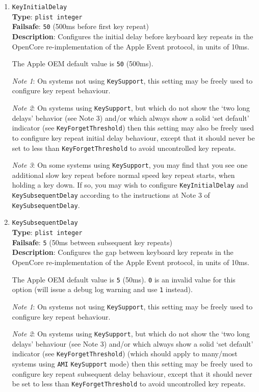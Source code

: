 \documentclass[]{article}
\begin{document}
\begin{enumerate}
\item
  \texttt{KeyInitialDelay}\\
  \textbf{Type}: \texttt{plist\ integer}\\
  \textbf{Failsafe}: \texttt{50} (500ms before first key repeat)\\
  \textbf{Description}: Configures the initial delay before keyboard key repeats in the
  OpenCore re-implementation of the Apple Event protocol, in units of 10ms.

  The Apple OEM default value is \texttt{50} (500ms).

  \emph{Note 1}: On systems not using \texttt{KeySupport}, this setting may be freely used
  to configure key repeat behaviour.

  \emph{Note 2}: On systems using \texttt{KeySupport}, but which do not show the `two long
  delays' behavior (see Note 3) and/or which always show a solid `set default' indicator (see \texttt{KeyForgetThreshold})
  then this setting may also be freely used to configure key repeat initial delay behaviour,
  except that it should never be set to less than \texttt{KeyForgetThreshold} to avoid
  uncontrolled key repeats.

  \emph{Note 3}: On some systems using \texttt{KeySupport}, you may find that you see
  one additional slow key repeat before normal speed key repeat starts, when holding a
  key down. If so, you may wish to configure \texttt{KeyInitialDelay} and \texttt{KeySubsequentDelay}
  according to the instructions at Note 3 of \texttt{KeySubsequentDelay}.


\item
  \texttt{KeySubsequentDelay}\\
  \textbf{Type}: \texttt{plist\ integer}\\
  \textbf{Failsafe}: \texttt{5} (50ms between subsequent key repeats)\\
  \textbf{Description}: Configures the gap between keyboard key repeats in the OpenCore re-implementation
  of the Apple Event protocol, in units of 10ms.

  The Apple OEM default value is \texttt{5} (50ms).
  \texttt{0} is an invalid value for this option (will issue a debug log warning and use \texttt{1} instead).

  \emph{Note 1}: On systems not using \texttt{KeySupport}, this setting may be freely used
  to configure key repeat behaviour.

  \emph{Note 2}: On systems using \texttt{KeySupport}, but which do not show the `two long
  delays' behaviour (see Note 3) and/or which always show a solid `set default' indicator
  (see \texttt{KeyForgetThreshold}) (which should apply to many/most systems using \texttt{AMI}
  \texttt{KeySupport} mode) then this setting may be freely used to configure key repeat
  subsequent delay behaviour, except that it should never be set to less than \texttt{KeyForgetThreshold}
  to avoid uncontrolled key repeats.


\end{enumerate}
\end{document}
